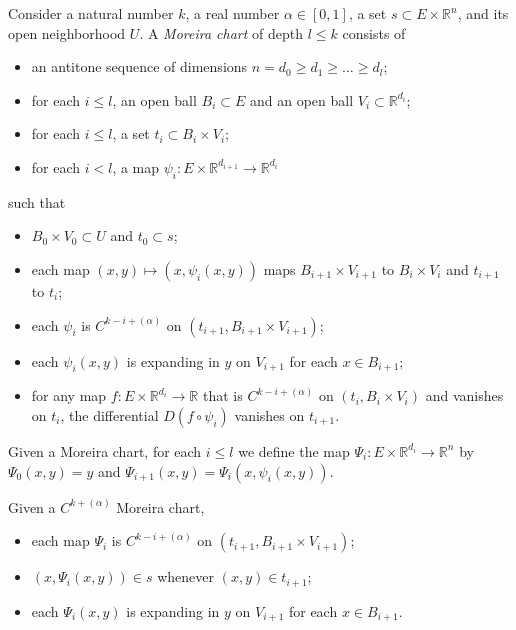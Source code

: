 \begin{definition}%
  \label{def:moreira-chart}
  Consider a natural number \(k\), a real number \(\alpha\in[0, 1]\),
  a set \(s \subset E \times \mathbb R^{n}\), and its open neighborhood \(U\).
  A \emph{Moreira chart} of depth \(l \le k\) consists of
  \begin{itemize}
  \item an antitone sequence of dimensions \(n = d_{0}\ge d_{1}\ge \dots \ge d_{l}\);
  \item for each \(i \le l\), an open ball \(B_{i} \subset E\) and an open ball \(V_{i}\subset \mathbb R^{d_{i}}\);
  \item for each \(i \le l\), a set \(t_{i}\subset B_{i}\times V_{i}\);
  \item for each \(i < l\), a map \(\psi_{i}\colon E\times \mathbb R^{d_{i+1}} \to \mathbb R^{d_{i}}\)
  \end{itemize}
  such that
  \begin{itemize}
  \item \(B_{0}\times V_{0}\subset U\) and \(t_{0}\subset s\);
  \item each map \((x, y) \mapsto (x, \psi_{i}(x, y))\)
    maps \(B_{i+1}\times V_{i+1}\) to \(B_{i}\times V_{i}\) and \(t_{i+1}\) to \(t_{i}\);
  \item each \(\psi_{i}\) is \(C^{k-i+(\alpha)}\) on \((t_{i+1}, B_{i+1}\times V_{i+1})\);
  \item each \(\psi_{i}(x, y)\) is expanding in \(y\) on \(V_{i+1}\) for each \(x \in B_{i + 1}\);
  \item for any map \(f\colon E\times \mathbb R^{d_{i}} \to \mathbb R\)
    that is \(C^{k-i+(\alpha)}\) on \((t_{i}, B_{i}\times V_{i})\) and vanishes on \(t_{i}\),
    the differential \(D(f \circ \psi_{i})\) vanishes on \(t_{i+1}\).
  \end{itemize}
\end{definition}

\begin{definition}%
  \label{def:moreira-chart-map}
  Given a Moreira chart, for each \(i \le l\) we define the map \(\Psi_{i}\colon E\times \mathbb R^{d_{i}}\to \mathbb R^{n}\)
  by \(\Psi_{0}(x, y)=y\) and \(\Psi_{i+1}(x, y)=\Psi_{i}(x, \psi_{i}(x, y))\).
\end{definition}

\begin{lemma}%
  \label{lem:moreira-chart-map-props}
  Given a \(C^{k+(\alpha)}\) Moreira chart,
  \begin{itemize}
  \item each map \(\Psi_{i}\) is \(C^{k-i+(\alpha)}\) on \((t_{i+1}, B_{i+1}\times V_{i+1})\);
  \item \((x, \Psi_{i}(x, y)) \in s\) whenever \((x, y) \in t_{i+1}\);
  \item each \(\Psi_{i}(x, y)\) is expanding in \(y\) on \(V_{i+1}\) for each \(x\in B_{i+1}\).
  \end{itemize}
\end{lemma}

